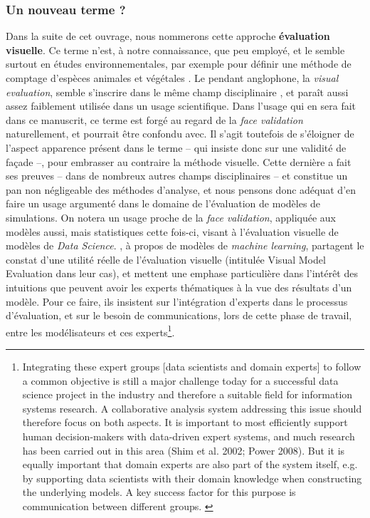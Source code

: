 \subsubsection{Un nouveau terme ?} Dans la suite de cet ouvrage, nous nommerons cette approche \og \textbf{évaluation visuelle}\fg{}.
Ce terme n'est, à notre connaissance, que peu employé, et le semble surtout en études environnementales, par exemple pour définir une méthode de comptage d'espèces animales et végétales \autocite[par exemple][]{harmelin-vivien_evaluation_1985}.
Le pendant anglophone, la \og \textit{visual evaluation}\fg{}, semble s'inscrire dans le même champ disciplinaire \autocite[par exemple][]{horst_assessment_1984}, et paraît aussi assez faiblement utilisée dans un usage scientifique.
Dans l'usage qui en sera fait dans ce manuscrit, ce terme est forgé au regard de la \og \textit{face validation}\fg{} naturellement, et pourrait être confondu avec.
Il s'agit toutefois de s'éloigner de l'aspect \og apparence\fg{} présent dans le terme -- qui insiste donc sur une validité de façade --, pour embrasser au contraire la méthode visuelle.
Cette dernière a fait ses preuves -- dans de nombreux autres champs disciplinaires -- et constitue un pan non négligeable des méthodes d'analyse, et nous pensons donc adéquat d'en faire un usage argumenté dans le domaine de l'évaluation de modèles de simulations.
On notera un usage proche de la \textit{face validation}, appliquée aux modèles aussi, mais statistiques cette fois-ci, visant à l'évaluation visuelle de modèles de \og \textit{Data Science}\fg{}.
\textcite{eilers_its_2017}, à propos de modèles de \textit{machine learning}, partagent le constat d'une utilité réelle de l'évaluation visuelle (intitulée \og Visual Model Evaluation\fg{} dans leur cas), et mettent une emphase particulière dans l'intérêt des intuitions que peuvent avoir les experts thématiques à la vue des résultats d'un modèle.
Pour ce faire, ils insistent sur l'intégration d'experts dans le processus d'évaluation, et sur le besoin de communications, lors de cette phase de travail, entre les modélisateurs et ces experts\footnote{
	\og Integrating these expert groups [data scientists and domain experts] to follow a common objective is still a major challenge today for a successful data science project in the industry and therefore a suitable field for information systems research.
	A collaborative analysis system addressing this issue should therefore focus on both aspects. It is important to most efficiently support human decision-makers with data-driven expert systems, and much research has been carried out in this area (Shim et al. 2002; Power 2008).
	But it is equally important that domain experts are also part of the system itself, e.g. by supporting data scientists with their domain knowledge when constructing the underlying models.
	A key success factor for this purpose is communication between different groups.\fg{} \autocite[2]{eilers_its_2017}
}.


